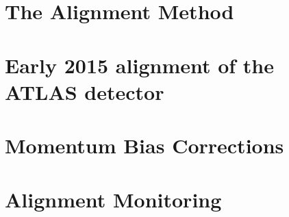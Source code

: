 
%

\section{The Alignment Method}\label{align:method}


\section{Early 2015 alignment of the ATLAS detector}\label{align:2015}


%

\section{Momentum Bias Corrections}\label{align:bias}


\section{Alignment Monitoring}\label{align:monitoring}

